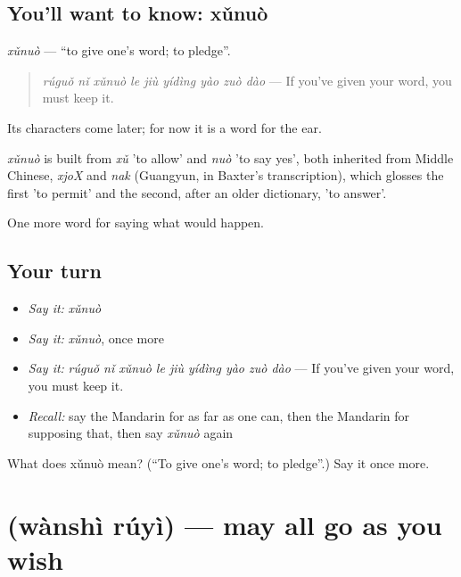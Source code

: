 \subsection*{You'll want to know: xǔnuò}
\emph{xǔnuò} — \textquotedblleft{}to give one's word; to pledge\textquotedblright{}.

\begin{quote}
\emph{rúguǒ nǐ xǔnuò le jiù yídìng yào zuò dào} — If you've given your word, you must keep it.
\end{quote}

Its characters come later; for now it is a word for the ear.

\begin{cousinweb}
\emph{xǔnuò} is built from \emph{xǔ} 'to allow' and \emph{nuò} 'to say yes', both inherited from Middle Chinese, \emph{xjoX} and \emph{nak} (Guangyun, in Baxter's transcription), which glosses the first 'to permit' and the second, after an older dictionary, 'to answer'.
\end{cousinweb}

\begin{grammarlens}[title={What you've built}]
One more word for saying what would happen.
\end{grammarlens}

\subsection*{Your turn}
\begin{itemize}
\raggedright
  \item \emph{Say it:} \emph{xǔnuò}
  \item \emph{Say it:} \emph{xǔnuò}, once more
  \item \emph{Say it:} \emph{rúguǒ nǐ xǔnuò le jiù yídìng yào zuò dào} — If you've given your word, you must keep it.
  \item \emph{Recall:} say the Mandarin for as far as one can, then the Mandarin for supposing that, then say \emph{xǔnuò} again
\end{itemize}

\begin{tcolorbox}[breakable,colback=teal!4,colframe=teal!35!black,title={Before you move on}]
What does xǔnuò mean? (\textquotedblleft{}To give one's word; to pledge\textquotedblright{}.) Say it once more.
\end{tcolorbox}
\section[\texorpdfstring{\zh{万事如意} (wànshì rúyì)}{万事如意 (wànshì rúyì)}]{ (wànshì rúyì) — may all go as you wish}

